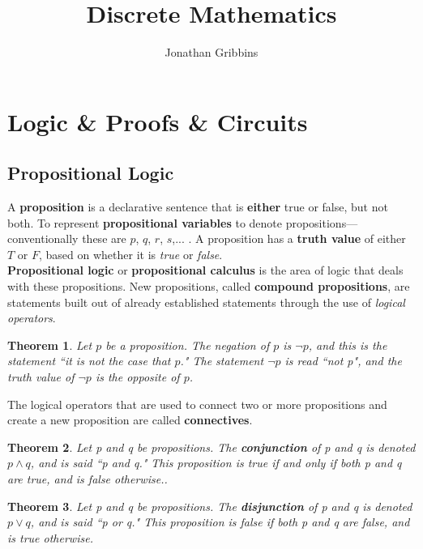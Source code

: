 \documentclass[12pt,letterpaper]{article}
\author{Jonathan Gribbins}
\title{Discrete Mathematics}
\date{}
\newtheorem{theorem}{Theorem}
\begin{document}
\maketitle

\tableofcontents

\pagebreak

\section{Logic \& Proofs \& Circuits}

\subsection{Propositional Logic}

A \textbf{proposition} is a declarative sentence that is \textbf{either} true or false, but not both. To represent \textbf{propositional variables} to denote propositions---conventionally these are $p$, $q$, $r$, $s$,... . A proposition has a \textbf{truth value} of either $T$ or $F$, based on whether it is \textit{true} or \textit{false}. \\

\textbf{Propositional logic} or \textbf{propositional calculus} is the area of logic that deals with these propositions. New propositions, called \textbf{compound propositions}, are statements built out of already established statements through the use of \textit{logical operators}.

\begin{theorem}
	Let $p$ be a proposition. The negation of $p$ is $\lnot p$, and this is the statement ``it is not the case that $p$." The statement $\lnot p$ is read ``not p", and the truth value of $\lnot p$ is the opposite of $p$.
\end{theorem}

The logical operators that are used to connect two or more propositions and create a new proposition are called \textbf{connectives}. 

\begin{theorem}
	Let p and q be propositions. The \textbf{conjunction} of p and q is denoted $p\wedge q$, and is said ``p and q." This proposition is true if and only if both p and q are true, and is false otherwise..
\end{theorem}

\begin{theorem}
	Let p and q be propositions. The \textbf{disjunction} of p and q is denoted $p\vee q$, and is said ``p or q." This proposition is false if both p and q are false, and is true otherwise.
\end{theorem}
\end{document}

